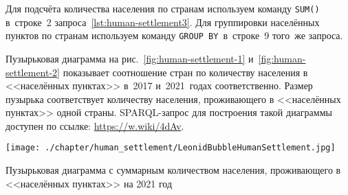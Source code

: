 Для подсчёта количества населения по странам 
используем команду \lstinline|SUM()| в~строке~2 запроса~\ref{lst:human-settlement3}. 
Для группировки населённых пунктов по странам 
используем команду \lstinline|GROUP BY|\, в~строке~9 того~же запроса.

Пузырьковая диаграмма на рис.~\ref{fig:human-settlement-1} и~\ref{fig:human-settlement-2} 
показывает соотношение стран по количеству населения в <<населённых пунктах>> 
в~2017 и~2021~годах соответственно. 
Размер пузырька соответствует количеству населения, проживающего в <<населённых пунктах>> одной страны. 
SPARQL-запрос для построения такой диаграммы доступен по ссылке: \href{https://w.wiki/4dAv}{https://w.wiki/4dAv}.

\begin{marginfigure}[0.0cm]
	\texttt{[image: ./chapter/human\_settlement/LeonidBubbleHumanSettlement.jpg]}
    \caption[Сколько населения проживает в населённых пунктах, 2021.]{Пузырьковая диаграмма с суммарным количеством населения, проживающего в <<населённых пунктах>> на 2021 год} 
	\label{fig:human-settlement-2}
\end{marginfigure}





